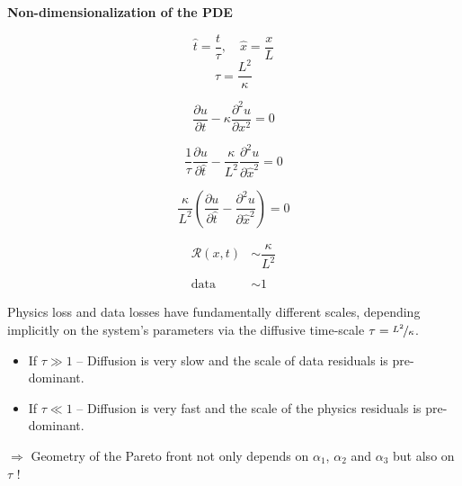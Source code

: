 \documentclass[aspectratio=169,compress,12pt,dvipsnames]{beamer}
\begin{document}
\begin{frame}
  \vfill
  \centering
  \textbf{Non-dimensionalization of the PDE}
  \vfill
  \begin{minipage}{.28\textwidth}
    \begin{overprint}
      \[
        \hat{t} = \dfrac{t}{\tau}, \quad \hat{x} = \dfrac{x}{L}
      \]
      \[
        \tau = \dfrac{L^2}{\kappa}
      \]
    \end{overprint}
  \end{minipage}%
  \hfill
  \begin{minipage}{.68\textwidth}
    \centering
    \begin{overprint}
      \[
        \dfrac{\partial u}{\partial t} - \kappa \dfrac{\partial^2 u}{\partial x^2}  = 0
      \]

      \[
        \dfrac{1}{\tau}  \dfrac{\partial u}{\partial \hat{t}}  - \dfrac{\kappa}{L^2} \dfrac{\partial^2 u}{\partial \hat{x}^2}  = 0
      \]

      \[
        \dfrac{\kappa}{L^2} \left( \dfrac{\partial u}{\partial \hat{t}} - \dfrac{\partial^2 u}{\partial \hat{x}^2} \right) = 0
      \]
    \end{overprint}
  \end{minipage}
  \vfill
\end{frame}

\begin{frame}
  \vfill
  \begin{minipage}{.28\textwidth}
    \[
      \begin{aligned}
        \mathcal{R}(x, t) & \sim \dfrac{\kappa}{L^2}  \\  \\
        \text{data} & \sim 1
      \end{aligned}
    \]
  \end{minipage}%
  \hfill
  \begin{minipage}{.68\textwidth}
    Physics loss and data losses have fundamentally different scales, depending implicitly on  the system's parameters via the diffusive time-scale $\tau = \nicefrac{L^2}{\kappa}$.
    \par\bigskip
    \begin{itemize}
      \item If $\tau \gg 1$ --  Diffusion is very slow and the scale of data residuals is pre-dominant.
      \item If $\tau \ll 1$ -- Diffusion is very fast and the scale of the physics residuals is pre-dominant.
    \end{itemize}
    \par\bigskip
    $\Longrightarrow$ Geometry of the Pareto front not only depends on $\alpha_1$, $\alpha_2$ and $\alpha_3$ but also on $\tau$ !
  \end{minipage}
  \vfill
\end{frame}
\end{document}
